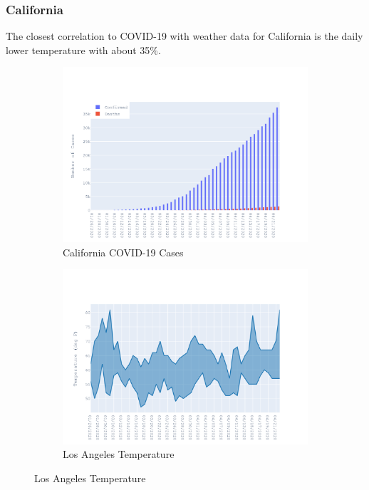 \documentclass{homework}
\begin{document}
\newpage
\subsubsection{California}

The closest correlation to COVID-19 with weather data for California is the daily lower temperature with about 35\%.

\begin{figure}[H]
  \centering
  \begin{subfigure}{0.45\linewidth}
    \includegraphics[width=\linewidth]{task4/California_cases.png}
    \caption{California COVID-19 Cases}
  \end{subfigure}
  \hfil
  \begin{subfigure}{0.45\linewidth}
    \includegraphics[width=\linewidth]{task4/California_temp.png}
    \caption{Los Angeles Temperature}
  \end{subfigure}


\end{figure}
\end{document}
